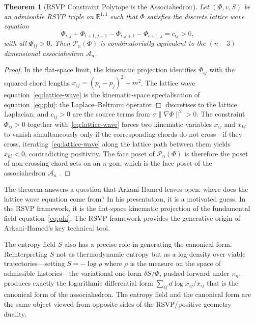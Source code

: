 \documentclass[12pt, oneside]{amsart}
\theoremstyle{plain}
\newtheorem{theorem}{Theorem}[section]
\theoremstyle{definition}
\theoremstyle{remark}
\newcommand{\R}{\mathbb{R}}
\newcommand{\Phif}{\Phi}
\newcommand{\vf}{v}
\newcommand{\Sf}{S}
\newcommand{\Assoc}{\mathcal{A}_n}
\begin{document}
\begin{theorem}[RSVP Constraint Polytope is the Associahedron]
\label{thm:assoc}
Let $(\Phif, \vf, \Sf)$ be an admissible RSVP triple on $\R^{1,1}$ such that $\Phif$ satisfies the discrete lattice wave equation
\begin{equation}
\label{eq:lattice-wave}
  \Phif_{i,j} + \Phif_{i+1,j+1} - \Phif_{i,j+1} - \Phif_{i+1,j} = c_{ij} > 0,
\end{equation}
with all $\Phif_{ij} > 0$. Then $\mathcal{P}_n(\Phif)$ is combinatorially equivalent to the $(n-3)$-dimensional associahedron $\Assoc$.
\end{theorem}

\begin{proof}
In the flat-space limit, the kinematic projection identifies $\Phif_{ij}$ with the squared chord lengths $x_{ij} = (p_i - p_j)^2 + m^2$. The lattice wave equation~\eqref{eq:lattice-wave} is the kinematic-space specialisation of equation~\eqref{eq:phi}: the Laplace--Beltrami operator $\Box$ discretises to the lattice Laplacian, and $c_{ij} > 0$ are the source terms from $\sigma\|\nabla\Phif\|^2 > 0$. The constraint $\Phif_{ij} > 0$ together with~\eqref{eq:lattice-wave} forces two kinematic variables $x_{ij}$ and $x_{kl}$ to vanish simultaneously only if the corresponding chords do not cross---if they cross, iterating~\eqref{eq:lattice-wave} along the lattice path between them yields $x_{kl} < 0$, contradicting positivity. The face poset of $\mathcal{P}_n(\Phif)$ is therefore the poset of non-crossing chord sets on an $n$-gon, which is the face poset of the associahedron $\Assoc$ \cite{Stasheff1963, Loday2004}.
\end{proof}

The theorem answers a question that Arkani-Hamed leaves open: where does the lattice wave equation come from? In his presentation, it is a motivated guess. In the RSVP framework, it is the flat-space kinematic projection of the fundamental field equation~\eqref{eq:phi}. The RSVP framework provides the generative origin of Arkani-Hamed's key technical tool.

The entropy field $\Sf$ also has a precise role in generating the canonical form. Reinterpreting $\Sf$ not as thermodynamic entropy but as a log-density over viable trajectories---setting $\Sf = -\log \rho$ where $\rho$ is the measure on the space of admissible histories---the variational one-form $\delta\Sf / \Phif$, pushed forward under $\pi_n$, produces exactly the logarithmic differential form $\sum_{ij} d\log x_{ij} / x_{ij}$ that is the canonical form of the associahedron. The entropy field and the canonical form are the same object viewed from opposite sides of the RSVP/positive geometry duality.
\end{document}
